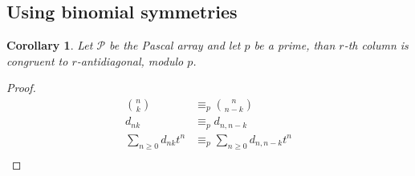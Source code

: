 \documentclass[10pt,a4paper]{article} %
\newtheorem{corollary}[theorem]{Corollary}
\begin{document}
    \subsection{Using binomial symmetries}

    \begin{corollary}
    Let $\mathcal{P}$ be the Pascal array and let $p$ be a prime, than $r$-th column 
    is congruent to $r$-antidiagonal, modulo $p$.
    \end{corollary}
    \begin{proof}
        \begin{displaymath}
            \begin{split}
                { {n} \choose {k} } &\equiv_{p} { {n} \choose {n-k} } \\
                d_{nk} &\equiv_{p} d_{n,n-k}\\
                \sum_{n\geq 0}{d_{nk} t^n} &\equiv_{p}\sum_{n\geq 0}{d_{n,n-k} t^n} \\
            \end{split}
        \end{displaymath}
    \end{proof}
\end{document}
